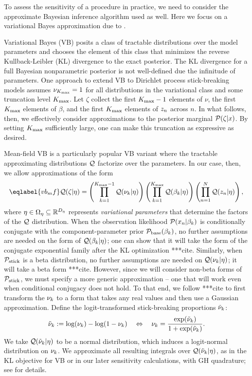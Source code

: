 To assess the sensitivity of a procedure in practice, we need to consider the approximate
Bayesian inference algorithm used as well. Here we focus on a variational Bayes approximation
due to \citet{blei:2006:vi_for_dp}.

Variational Bayes (VB) posits a class of tractable distributions over the model parameters and chooses the 
element of this class that minimizes the reverse Kullback-Leibler (KL) divergence to the exact posterior. The KL divergence
for a full Bayesian nonparametric posterior is not well-defined due the infinitude of parameters. One approach
to extend VB to Dirichlet process stick-breaking models 
assumes $\nu_{K_{\mathrm{max}}} = 1$ for all distributions in the variational class and some truncation level ${K_{\mathrm{max}}}$.
Let $\zeta$ collect the first ${K_{\mathrm{max}}} - 1$ elements of $\nu$, the first ${K_{\mathrm{max}}}$ elements of $\beta$,
and the first ${K_{\mathrm{max}}}$ elements of $z_n$ across $n$.
In what follows, then, we effectively consider approximations to the posterior marginal $\mathcal{P}(\zeta \vert x)$.
By setting ${K_{\mathrm{max}}}$ sufficiently large, one can make this truncation as expressive as desired.

Mean-field VB is a particularly popular VB variant where the tractable approximating distributions $\mathcal{Q}$ factorize
over the parameters. In our case, then, we allow approximations of the form
%
\begin{align}\eqlabel{vb_mf}
%
\q(\zeta \vert \eta) =
    \left( \prod_{\k=1}^{\kmax - 1} \q(\nuk \vert \eta) \right)
    \left( \prod_{\k=1}^{\kmax} \q(\beta_\k \vert \eta) \right)
    \left( \prod_{\n=1}^{\N} \q(\z_{\n} \vert \eta) \right),
%
\end{align}
%
where $\eta \in \Omega_{\eta} \subseteq
\mathbb{R}^{{D_{\eta}}}$ represents \emph{variational parameters} that determine the factors of
the $\mathcal{Q}$ distribution. When the observation likelihood $\mathcal{P}(x_n \vert \beta_k)$ is conditionally
conjugate with the component-parameter prior $\mathcal{P}_{\mathrm{base}}(\beta_k)$, no further assumptions
are needed on the form of $\mathcal{Q}(\beta_k \vert \eta)$; one can show that it will
take the form of the conjugate exponential family after the KL optimization ***cite.
Similarly, when $\mathcal{P}_{\mathrm{stick}}$ is a beta distribution,
no further assumptions are needed on $\mathcal{Q}(\nu_{k} \vert \eta)$; it will take a beta form ***cite.
However, since we will consider non-beta forms of $\mathcal{P}_{\mathrm{stick}}$, we must specify a more generic
approximation -- one that will work even when conditional conjugacy does not hold. To that end, we
follow ***cite to first transform the $\nu_{k}$ to a form that takes any real values and then use a Gaussian approximation.
Define the logit-transformed stick-breaking
proportions $\tilde{\nu}_{k}$:
%
\begin{align*}
  \lnu_\k := \log(\nu_\k) - \log(1 - \nu_\k)
  \quad \Leftrightarrow \quad
  \nuk = \frac{\exp(\lnu_\k)}{1 + \exp(\lnu_\k)}.
\end{align*}
%
We take $\mathcal{Q}(\tilde{\nu}_{k} \vert \eta)$ to be a normal distribution, which induces a
logit-normal distribution on $\nu_{k}$. We approximate all resulting integrals
over $\mathcal{Q}(\tilde{\nu}_{k} \vert \eta)$, as in the KL objective for VB or in our later sensitivity calculations, with GH quadrature;
see  for details.

